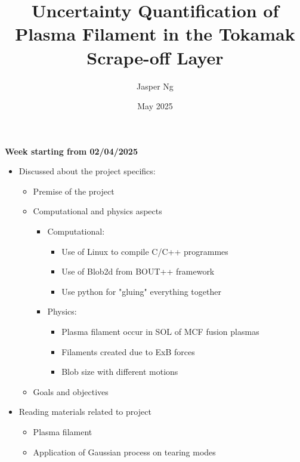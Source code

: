 \documentclass{article}
\title{\textbf{Uncertainty Quantification of Plasma Filament in the Tokamak Scrape-off Layer}}
\author{Jasper Ng}
\date{May 2025}
\begin{document}
\maketitle


\begin{arrowlist}
    \item \textbf{Week starting from 02/04/2025}
    \begin{itemize}
        \item Discussed about the project specifics:
        \begin{itemize}
        	\item Premise of the project
        	\item Computational and physics aspects
            \begin{itemize}
        		\item[] Computational:
                \begin{itemize}
        			\item Use of Linux to compile C/C++ programmes
        			\item Use of Blob2d from BOUT++ framework
        			\item Use python for "gluing" everything together
                \end{itemize}
        		\item[] Physics:
                \begin{itemize}
        			\item Plasma filament occur in SOL of MCF fusion plasmas
        			\item Filaments created due to ExB forces
        			\item Blob size with different motions
                \end{itemize}
            \end{itemize}
        	\item Goals and objectives
        \end{itemize}
        \item Reading materials related to project
        \begin{itemize}
        	\item Plasma filament
        	\item Application of Gaussian process on tearing modes
        \end{itemize}
    \end{itemize}
    

\end{arrowlist}
\end{document}
